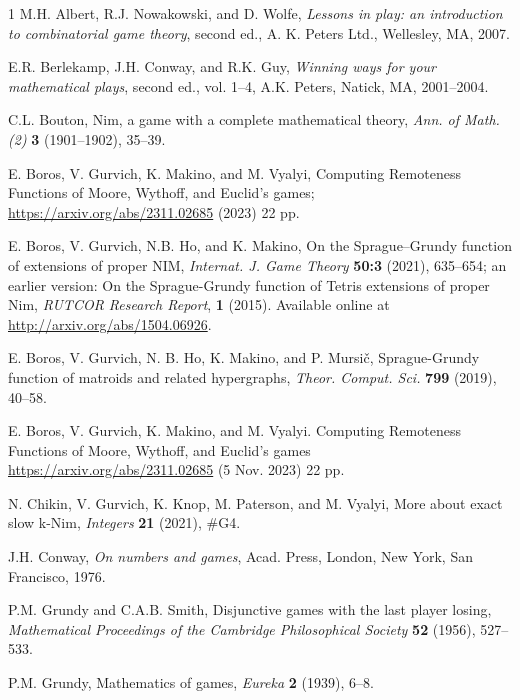 \documentclass[10pt]{article}
\theoremstyle{definition}
\begin{document}
\begin{thebibliography}{1}\footnotesize  
{}
M.H. Albert, R.J. Nowakowski, and D. Wolfe,
{\it Lessons in play: an introduction to combinatorial game theory},
second ed., A. K. Peters Ltd., Wellesley, MA, 2007.

E.R. Berlekamp, J.H. Conway, and R.K. Guy, 
{\it Winning ways for your mathematical plays}, second ed., vol. 1–4, 
A.K. Peters, Natick, MA, 2001--2004.

C.L. Bouton, Nim, a game with a complete mathematical theory,
{\it Ann. of Math. (2)}  {\bf3} (1901--1902), 35--39.

E. Boros, V. Gurvich, K. Makino, and M. Vyalyi, 
Computing Remoteness Functions 
of Moore, Wythoff, and Euclid's games; 
\url{https://arxiv.org/abs/2311.02685} (2023) 22 pp.

E. Boros, V. Gurvich, N.B. Ho, and K. Makino,
On the Sprague--Grundy function of extensions of proper NIM,
{\it Internat. J. Game Theory} {\bf 50:3} (2021), 635--654;
an earlier version: 
On the Sprague-Grundy function of Tetris extensions of proper {\sc Nim},
{\it RUTCOR Research Report}, {\bf 1} (2015).  Available online at
\url{http://arxiv.org/abs/1504.06926}. 

E. Boros, V. Gurvich, N. B. Ho, K. Makino, and  P. Mursi\v{c}, 
Sprague-Grundy function of matroids and related hypergraphs, 
{\it Theor. Comput. Sci.} {\bf799} (2019), 40--58. 

E. Boros, V. Gurvich, K. Makino, and M. Vyalyi.
Computing Remoteness Functions 
of Moore, Wythoff, and Euclid's games
\url{https://arxiv.org/abs/2311.02685} (5 Nov. 2023) 22 pp.

N. Chikin, V. Gurvich, K. Knop, M. Paterson, 
and M. Vyalyi, 
More about exact slow k-Nim, 
{\it Integers} {\bf 21} (2021), \#G4.   

J.H. Conway, {\it On numbers and games}, Acad. Press, 
London, New York, San Francisco, 1976.

P.M. Grundy and C.A.B. Smith, 
Disjunctive games with the last player losing, 
{\it Mathematical Proceedings of 
the Cambridge Philosophical Society} {\bf52} (1956), 527--533.

P.M. Grundy, Mathematics of games, {\it Eureka} {\bf2} (1939), 6--8.


\end{thebibliography}
\end{document}

